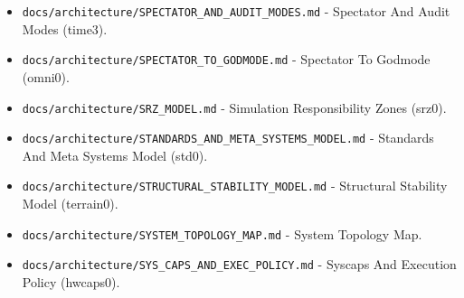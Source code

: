 \documentclass[9pt,a4paper,openany]{book}
\begin{document}
\begin{itemize}
\item \texttt{docs/\allowbreak{}architecture/\allowbreak{}SPECTATOR\_\allowbreak{}AND\_\allowbreak{}AUDIT\_\allowbreak{}MODES.\allowbreak{}md} -\allowbreak{} Spectator And Audit Modes (time3).\allowbreak{}
\end{itemize}

\begin{itemize}
\item \texttt{docs/\allowbreak{}architecture/\allowbreak{}SPECTATOR\_\allowbreak{}TO\_\allowbreak{}GODMODE.\allowbreak{}md} -\allowbreak{} Spectator To Godmode (omni0).\allowbreak{}
\end{itemize}

\begin{itemize}
\item \texttt{docs/\allowbreak{}architecture/\allowbreak{}SRZ\_\allowbreak{}MODEL.\allowbreak{}md} -\allowbreak{} Simulation Responsibility Zones (srz0).\allowbreak{}
\end{itemize}

\begin{itemize}
\item \texttt{docs/\allowbreak{}architecture/\allowbreak{}STANDARDS\_\allowbreak{}AND\_\allowbreak{}META\_\allowbreak{}SYSTEMS\_\allowbreak{}MODEL.\allowbreak{}md} -\allowbreak{} Standards And Meta Systems Model (std0).\allowbreak{}
\end{itemize}

\begin{itemize}
\item \texttt{docs/\allowbreak{}architecture/\allowbreak{}STRUCTURAL\_\allowbreak{}STABILITY\_\allowbreak{}MODEL.\allowbreak{}md} -\allowbreak{} Structural Stability Model (terrain0).\allowbreak{}
\end{itemize}

\begin{itemize}
\item \texttt{docs/\allowbreak{}architecture/\allowbreak{}SYSTEM\_\allowbreak{}TOPOLOGY\_\allowbreak{}MAP.\allowbreak{}md} -\allowbreak{} System Topology Map.\allowbreak{}
\end{itemize}

\begin{itemize}
\item \texttt{docs/\allowbreak{}architecture/\allowbreak{}SYS\_\allowbreak{}CAPS\_\allowbreak{}AND\_\allowbreak{}EXEC\_\allowbreak{}POLICY.\allowbreak{}md} -\allowbreak{} Syscaps And Execution Policy (hwcaps0).\allowbreak{}
\end{itemize}
\end{document}
